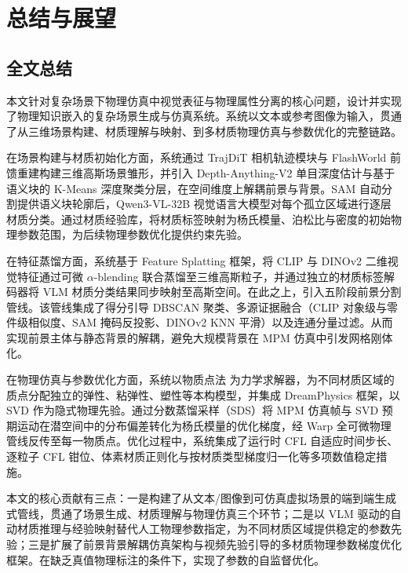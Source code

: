 ﻿\chapter{总结与展望}

\section{全文总结}

本文针对复杂场景下物理仿真中视觉表征与物理属性分离的核心问题，设计并实现了物理知识嵌入的复杂场景生成与仿真系统。系统以文本或参考图像为输入，贯通了从三维场景构建、材质理解与映射、到多材质物理仿真与参数优化的完整链路。

在场景构建与材质初始化方面，系统通过 TrajDiT\cite{director3d} 相机轨迹模块与 FlashWorld\cite{flashworld} 前馈重建构建三维高斯场景雏形，并引入 Depth-Anything-V2\cite{depthanythingv2} 单目深度估计与基于语义块的 K-Means\cite{kmeans} 深度聚类分层，在空间维度上解耦前景与背景。SAM\cite{sam} 自动分割提供语义块轮廓后，Qwen3-VL-32B\cite{qwen3vl} 视觉语言大模型对每个孤立区域进行逐层材质分类。通过材质经验库，将材质标签映射为杨氏模量、泊松比与密度的初始物理参数范围，为后续物理参数优化提供约束先验。

在特征蒸馏方面，系统基于 Feature Splatting\cite{featuresplatting} 框架，将 CLIP\cite{clip} 与 DINOv2\cite{dinov2} 二维视觉特征通过可微 $\alpha$-blending 联合蒸馏至三维高斯粒子，并通过独立的材质标签解码器将 VLM 材质分类结果同步映射至高斯空间。在此之上，引入五阶段前景分割管线。该管线集成了得分引导 DBSCAN\cite{dbscan} 聚类、多源证据融合（CLIP 对象级与零件级相似度、SAM 掩码反投影、DINOv2 KNN 平滑）以及连通分量过滤。从而实现前景主体与静态背景的解耦，避免大规模背景在 MPM 仿真中引发网格刚体化。

在物理仿真与参数优化方面，系统以物质点法\cite{mpm,physgaussian} 为力学求解器，为不同材质区域的质点分配独立的弹性、粘弹性、塑性等本构模型，并集成 DreamPhysics\cite{dreamphysics} 框架，以 SVD\cite{svd} 作为隐式物理先验。通过分数蒸馏采样（SDS）将 MPM 仿真帧与 SVD 预期运动在潜空间中的分布偏差转化为杨氏模量的优化梯度，经 Warp\cite{warp} 全可微物理管线反传至每一物质点。优化过程中，系统集成了运行时 CFL 自适应时间步长、逐粒子 CFL 钳位、体素材质正则化与按材质类型梯度归一化等多项数值稳定措施。

本文的核心贡献有三点：一是构建了从文本/图像到可仿真虚拟场景的端到端生成式管线，贯通了场景生成、材质理解与物理仿真三个环节；二是以 VLM 驱动的自动材质推理与经验映射替代人工物理参数指定，为不同材质区域提供稳定的参数先验；三是扩展了前景背景解耦仿真架构与视频先验引导的多材质物理参数梯度优化框架。在缺乏真值物理标注的条件下，实现了参数的自监督优化。


